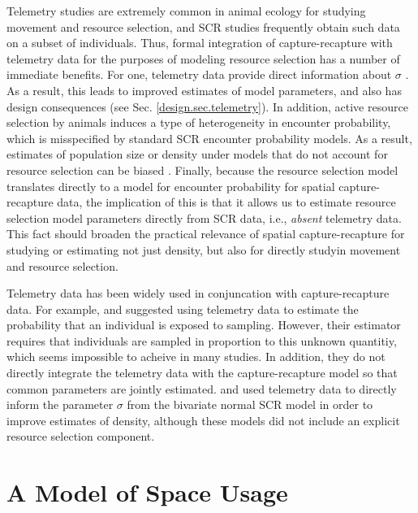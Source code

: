 Telemetry studies are extremely common in animal ecology for studying
movement and resource selection, and SCR studies frequently obtain
such data on a subset of individuals. Thus, formal integration of
capture-recapture with telemetry data for the purposes of modeling
resource selection has a number of immediate benefits. For one,
telemetry data provide direct information about $\sigma$
\citep{sollmann_etal:2012ecol,sollmann_etal:inprepjapplecol}. As a
result, this leads to improved estimates of model parameters, and also
has design consequences (see Sec. \ref{design.sec.telemetry}).  In
addition, active resource selection by animals induces a type of
heterogeneity in encounter probability, which is misspecified by
standard SCR encounter probability models. As a result, estimates of
population size or density under models that do not account for
resource selection can be biased \citep{royle_etal:2012mee}.  Finally,
because the resource selection model translates directly to a model
for encounter probability for spatial capture-recapture data, the
implication of this is that it allows us to estimate resource
selection model parameters directly from SCR data, i.e., {\it absent}
telemetry data. This fact should broaden the practical relevance of
spatial capture-recapture for studying or estimating not just density,
but also for directly studyin movement and resource selection.

Telemetry data has been widely used in conjuncation with
capture-recapture data.  For example, \citet{white_shenk:2001} and
\citet{ivan:2012} suggested using telemetry data to estimate the
probability that an individual is exposed to sampling. However, their
estimator requires that individuals are sampled in proportion to this
unknown quantitiy, which seems impossible to acheive in many
studies. In addition, they do not directly integrate the telemetry
data with the capture-recapture model so that common parameters are
jointly estimated.  \citet{sollmann_etal:inprepjapplecol} and
\citet{sollmann_etal:2012ecol} used telemetry data to directly inform
the parameter $\sigma$ from the bivariate normal SCR model in order to
improve estimates of density, although these models did not include an
explicit resource selection component.







\section{A Model of Space Usage}
\label{rsf.sec.rsfmodel}


